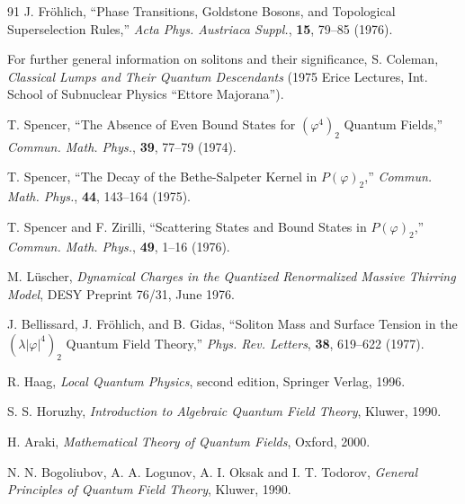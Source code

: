 \begin{thebibliography}{91}
J. Fr\"ohlich, ``Phase Transitions, Goldstone Bosons, and Topological
Superselection Rules,'' \emph{Acta Phys. Austriaca Suppl.}, \textbf{15},
79--85 (1976).

For further general information on solitons and their significance, S. Coleman,
\emph{Classical Lumps and Their Quantum Descendants} (1975 Erice Lectures,
Int. School of Subnuclear Physics ``Ettore Majorana'').

T. Spencer, ``The Absence of Even Bound States for $(\varphi^4)_2$ Quantum
Fields,'' \emph{Commun. Math. Phys.}, \textbf{39}, 77--79 (1974).

T. Spencer, ``The Decay of the Bethe-Salpeter Kernel in $P(\varphi)_2$,''
\emph{Commun. Math. Phys.}, \textbf{44}, 143--164 (1975).

T. Spencer and F. Zirilli, ``Scattering States and Bound States in
$P(\varphi)_2$,'' \emph{Commun. Math. Phys.}, \textbf{49}, 1--16 (1976).

M. L\"uscher, \emph{Dynamical Charges in the Quantized Renormalized Massive
Thirring Model}, DESY Preprint 76/31, June 1976.

J. Bellissard, J. Fr\"ohlich, and B. Gidas, ``Soliton Mass and Surface Tension
in the $(\lambda|\varphi|^4)_2$ Quantum Field Theory,'' \emph{Phys. Rev.
Letters}, \textbf{38}, 619--622 (1977).

R. Haag, \emph{Local Quantum Physics}, second edition, Springer Verlag, 1996.

S. S. Horuzhy, \emph{Introduction to Algebraic Quantum Field Theory}, Kluwer,
1990.

H. Araki, \emph{Mathematical Theory of Quantum Fields}, Oxford, 2000.

N. N. Bogoliubov, A. A. Logunov, A. I. Oksak and I. T. Todorov,
\emph{General Principles of Quantum Field Theory}, Kluwer, 1990.

\let\bibitem\pctbibliographybibitem
\end{thebibliography}
